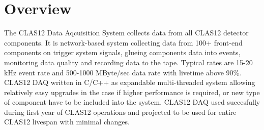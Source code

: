 \section{Overview}

The CLAS12 Data Aqcuisition System collects data from all CLAS12 detector components. It is network-based system collecting data from 100+ front-end components on trigger system signals, glueing components data into events, monitoring data quality and recording data to the tape. Typical rates are 15-20 kHz event rate and 500-1000 MByte/sec data rate with livetime above 90\%. CLAS12 DAQ written in C/C++ as expandable multi-threaded system allowing relatively easy upgrades in the case if higher performance is required, or new type of component have to be included into the system. CLAS12 DAQ used succesfully
during first year of CLAS12 operations and projected to be used for entire CLAS12 livespan with minimal changes.


